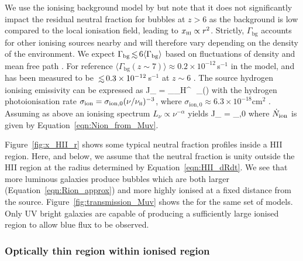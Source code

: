 \documentclass[fleqn,usenatbib]{mnras}
\begin{document}
We use the ionising background model by \citet{Khaire2019} but note that it does not significantly impact the residual neutral fraction for bubbles at $z>6$ as the background is low compared to the local ionisation field, leading to $\xHI\propto r^2$. Strictly, $\Gamma_\textrm{bg}$ accounts for other ionising sources nearby and will therefore vary depending on the density of the environment. We expect $\Gamma_\textrm{bg} \simlt 6 \langle \Gamma_\textrm{bg} \rangle$ based on fluctuations of density and mean free path \citep{MesingerDijkstra2008,Davies2016}. For reference $\langle \Gamma_\textrm{bg}(z\sim7) \rangle \approx 0.2\times10^{-12}$\,s$^{-1}$ in the \citet{Khaire2019} model, and has been measured to be $\simlt 0.3\times10^{-12}$\,s$^{-1}$ at $z\sim6$ \citep{Wyithe2010,Calverley2011}. The source hydrogen ionising emissivity can be expressed as
%
\BE \label{eqn:HII_gammasource}
J_ = \fesc \int_{\nu_H}^\infty \,\dd\nu \,  \sigma_(\nu)
\EE
%
with the hydrogen photoionisation rate $\sigma_\mathrm{ion} = \sigma_{\mathrm{ion},0} (\nu/\nu_\textsc{h})^{-3}$, where $\sigma_{\mathrm{ion},0} \approx 6.3\times10^{-18}\textrm{cm}^2$ \citep[e.g.,][]{Draine2011}. Assuming as above an ionising spectrum $L_\nu \propto \nu^{-\alpha}$ yields
%
\BE \label{eqn:HII_gammasource_Nion}
J_ = \fesc  \Nion {} \sigma_{,0}
\EE
%
where $\Nion$ is given by Equation~\eqref{eqn:Nion_from_Muv}.

Figure~\ref{fig:x_HII_r} shows some typical neutral fraction profiles inside a HII region. Here, and below, we assume that the neutral fraction is unity outside the HII region at the radius determined by Equation~\ref{eqn:HII_dRdt}. We see that more luminous galaxies produce bubbles which are both larger (Equation~\ref{eqn:Rion_approx}) and more highly ionised at a fixed distance from the source. Figure~\ref{fig:transmission_Muv} shows the \lya for the same set of models. Only UV bright galaxies are capable of producing a sufficiently large ionised region to allow blue flux to be observed.

\subsubsection{Optically thin region within ionised region}
\label{sec:model_thinregion}
\end{document}

